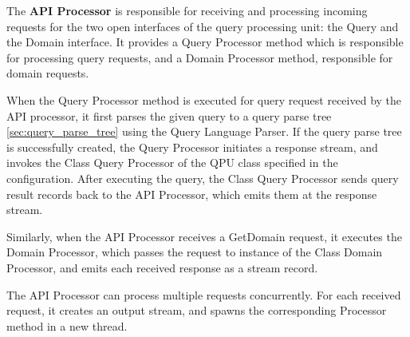 \bigskip
\noindent
The \textbf{API Processor} is responsible for receiving and processing incoming requests for the two open interfaces of
the query processing unit:
the Query and the Domain interface.
It provides a Query Processor method which is responsible for processing query requests,
and a Domain Processor method, responsible for domain requests.

When the Query Processor method is executed for query request received by the API processor,
it first parses the given query to a query parse tree \ref{sec:query_parse_tree} using the Query Language Parser.
If the query parse tree is successfully created, the Query Processor initiates a response stream,
and invokes the Class Query Processor of the QPU class specified in the configuration.
After executing the query, the Class Query Processor sends query result records back to the API Processor,
which emits them at the response stream.

Similarly, when the API Processor receives a GetDomain request,
it executes the Domain Processor, which passes the request to instance of the Class Domain Processor,
and emits each received response as a stream record.

The API Processor can process multiple requests concurrently.
For each received request, it creates an output stream,
and spawns the corresponding Processor method in a new thread.

